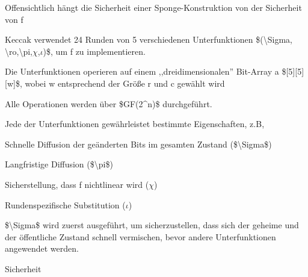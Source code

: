 \documentclass[a4paper]{article}
\begin{document}
\begin{multicols}{3}
\begin{itemize*}
            \begin{itemize*}
                  \item Offensichtlich hängt die Sicherheit einer Sponge-Konstruktion von der Sicherheit von f
                  \item Keccak verwendet 24 Runden von 5 verschiedenen Unterfunktionen \$(\textbackslash Sigma, \textbackslash ro,\textbackslash pi,$\chi$,$\iota$)\$, um f zu implementieren.
                  \item Die Unterfunktionen operieren auf einem ,,dreidimensionalen'' Bit-Array a \${[}5{]}{[}5{]}{[}w{]}\$, wobei w entsprechend der Größe r und c gewählt wird
                  \item Alle Operationen werden über \$GF(2\^{}n)\$ durchgeführt.
                  \item Jede der Unterfunktionen gewährleistet bestimmte Eigenschaften, z.B,
                  \begin{itemize*} \item Schnelle Diffusion der geänderten Bits im gesamten Zustand (\$\textbackslash Sigma\$) \item Langfristige Diffusion (\$\textbackslash pi\$) \item Sicherstellung, dass f nichtlinear wird ($\chi$) \item Rundenspezifische Substitution ($\iota$) \end{itemize*}
            \end{itemize*}
            \item
            \$\textbackslash Sigma\$ wird zuerst ausgeführt, um sicherzustellen,
            dass sich der geheime und der öffentliche Zustand schnell vermischen,
            bevor andere Unterfunktionen angewendet werden.
            \item
            Sicherheit


\end{itemize*}
\end{multicols}
\end{document}
